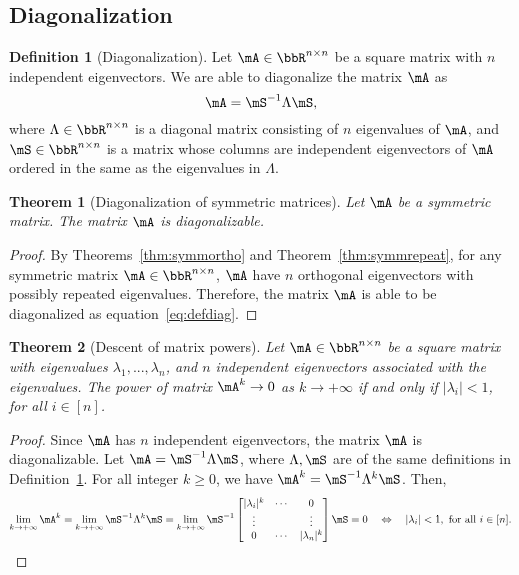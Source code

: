 \documentclass[11pt]{article}
\theoremstyle{plain}
\newtheorem{thm}{Theorem}[section]
\theoremstyle{definition}
\newtheorem{defn}{Definition}
\begin{document}
\subsection{Diagonalization}

\begin{defn}[Diagonalization]\label{def:diagonalization}
	Let  $\mA \in \bbR^{n \times n}$ be a square matrix with $n$ independent eigenvectors. We are able to  diagonalize the matrix $\mA$ as
	\begin{equation}\label{eq:defdiag}
		\mA = \mS^{-1} \Lambda \mS,
	\end{equation}
	where $\Lambda \in \bbR^{n \times n}$ is a diagonal matrix consisting of $n$ eigenvalues of $\mA$, and  $\mS \in \bbR^{n \times n}$ is a matrix whose columns are independent eigenvectors of $\mA$ ordered in the same as the eigenvalues in $\Lambda$.
\end{defn}

\begin{thm}[Diagonalization of symmetric matrices]
Let $\mA$ be a symmetric matrix. The matrix $\mA$ is diagonalizable.
\end{thm}

\begin{proof}
	By Theorems~\ref{thm:symmortho} and Theorem~\ref{thm:symmrepeat}, for any symmetric matrix $\mA \in \bbR^{n \times n}$, $\mA$ have $n$ orthogonal eigenvectors with possibly repeated eigenvalues. Therefore, the matrix $\mA$   is able to be diagonalized as equation~\eqref{eq:defdiag}.
\end{proof}

\begin{thm}[Descent of matrix powers]
	Let $\mA \in \bbR^{n \times n}$ be  a square matrix with eigenvalues $\lambda_1,...,\lambda_n$, and  $n$ independent eigenvectors associated with the eigenvalues. The power of matrix $\mA^k \rightarrow 0$ as $k \rightarrow +\infty$ if and only if $|\lambda_i| < 1$, for all $i \in [n]$.
\end{thm}

\begin{proof}
Since $\mA$ has $n$ independent eigenvectors, the matrix $\mA$ is diagonalizable.
	Let $\mA =\mS^{-1} \Lambda \mS$, where $\Lambda, \mS$ are of the same definitions in Definition~\ref{def:diagonalization}. For all integer $k\geq 0$, we have $\mA^k = \mS^{-1} \Lambda^{k} \mS$. Then,
	\[ \lim_{k \rightarrow +\infty} \mA^k = \lim_{k \rightarrow +\infty} \mS^{-1} \Lambda^{k} \mS  =  \lim_{k \rightarrow +\infty} \mS^{-1} \begin{bmatrix}
		|\lambda_i|^k & \cdots &0\\
		\vdots & &\vdots\\
		0 & \cdots & |\lambda_n|^k
	\end{bmatrix} \mS  = 0 \quad \Leftrightarrow \quad  |\lambda_i| < 1, \text{ for all } i \in [n]. \]
\end{proof}
\end{document}

